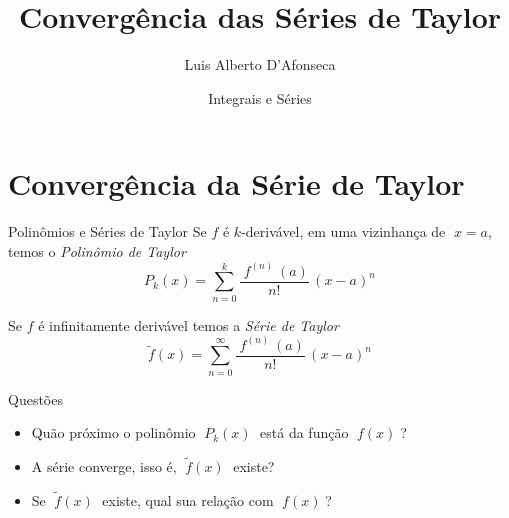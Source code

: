 
\usepackage{apresentacao}
\usepackage{mathconfig}
\usepackage{tabto}

\makeatletter
\graphicspath  {{./figs/}}
\makeatother

\setcounter{exemplo}{0}

\title {Convergência das Séries de Taylor}
\author{\large Luis Alberto D'Afonseca}
\date  {Integrais e Séries}



\begin{frame}
    \titlepage
\end{frame}

\section{Convergência da Série de Taylor}

\begin{frame}{Polinômios e Séries de Taylor}
  Se $f$ é $k$-derivável, em uma vizinhança de $\;x=a$, temos o \emph{Polinômio de Taylor}
  \[
    P_k(x) = \sum_{n=0}^k \frac{\;f^{(n)\;}(a)}{n!}\,(x-a)^n
  \]

  \pause
  \vspace{\baselineskip}
  Se $f$ é infinitamente derivável temos a \emph{Série de Taylor}
  \[
    \tilde{f}(x) = \sum_{n=0}^\infty \frac{\;f^{(n)\;}(a)}{n!}\,(x-a)^n
  \]
\end{frame}

\begin{frame}{Questões}
  \begin{itemize}[<+->]
    \item Quão próximo o polinômio $\;P_k(x)\;$ está da função $\;f(x)\;$?
    \vspace{\baselineskip}
    \item A série converge, isso é, $\;\tilde{f}(x)\;$ existe?
    \vspace{\baselineskip}
    \item Se $\;\tilde{f}(x)\;$ existe, qual sua relação com $\;f(x)\;$?
  \end{itemize}
\end{frame}

